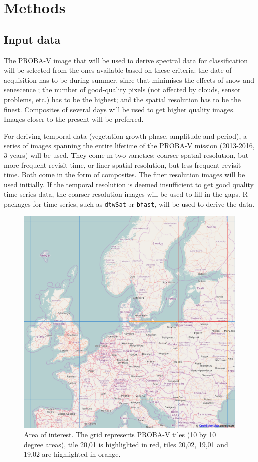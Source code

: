 \documentclass[a4paper,10pt]{article}
\begin{document}
\section{Methods}

\subsection{Input data}

The PROBA-V image that will be used to derive spectral data for classification will be selected from the ones available based on these criteria: the date of acquisition has to be during summer, since that minimises the effects of snow and senescence \citep{bartalev2014probavboreal}; the number of good-quality pixels (not affected by clouds, sensor problems, etc.) has to be the highest; and the spatial resolution has to be the finest. Composites of several days will be used to get higher quality images. Images closer to the present will be preferred.

For deriving temporal data (vegetation growth phase, amplitude and period), a series of images spanning the entire lifetime of the PROBA-V mission (2013-2016, 3 years) will be used. They come in two varieties: coarser spatial resolution, but more frequent revisit time, or finer spatial resolution, but less frequent revisit time. Both come in the form of composites. The finer resolution images will be used initially. If the temporal resolution is deemed insufficient to get good quality time series data, the coarser resolution images will be used to fill in the gaps. R packages for time series, such as \texttt{dtwSat} or \texttt{bfast}, will be used to derive the data.

\begin{figure}
 \includegraphics[width=\textwidth]{./proposal-figures/probavgrid.png}
 \caption{Area of interest. The grid represents PROBA-V tiles (10 by 10 degree areas), tile 20,01 is highlighted in red, tiles 20,02, 19,01 and 19,02 are highlighted in orange.}
 \label{AOI}
\end{figure} 
\end{document}
